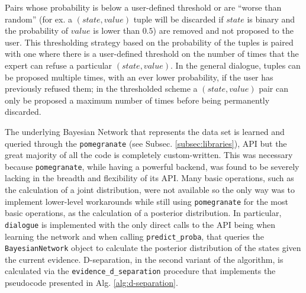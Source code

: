 \begin{itemize}
  	Pairs whose probability is below a user-defined threshold or are \enquote{worse than random} (for ex. a $(state,value)$ tuple will be discarded if $state$ is binary and the probability of $value$ is lower than $0.5$) are removed and not proposed to the user. 
  	This thresholding strategy based on the probability of the tuples is paired with one where there is a user-defined threshold on the number of times that the expert can refuse a particular $(state,value)$. 
  	In the general dialogue, tuples can be proposed multiple times, with an ever lower probability, if the user has previously refused them; in the thresholded scheme a $(state,value)$ pair can only be proposed a maximum number of times before being permanently discarded.
\end{itemize}

The underlying Bayesian Network that represents the data set is learned and queried through the  \texttt{pomegranate} (see Subsec. \ref{subsec:libraries}), API but the great majority of all the code is completely custom-written.
This was necessary because \texttt{pomegranate}, while having a powerful backend, was found to be severely lacking in the breadth and flexibility of its API.
Many basic operations, such as the calculation of a joint distribution, were not available so the only way was to implement lower-level workarounds while still using \texttt{pomegranate} for the most basic operations, as the calculation of a posterior distribution.
In particular, \texttt{dialogue} is implemented with the only direct calls to the API being when learning the network and when calling \texttt{predict\_proba}, that queries the \texttt{BayesianNetwork} object to calculate the posterior distribution of the states given the current evidence.
D-separation, in the second variant of the algorithm, is calculated via the \texttt{evidence\_d\_separation} procedure that implements the pseudocode presented in Alg. \ref{alg:d-separation}.

